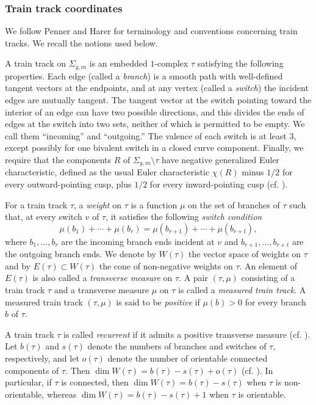 \documentclass[dvipdfmx]{amsart}
\theoremstyle{remark}
\begin{document}
\subsubsection{Train track coordinates}
We follow Penner and Harer \cite{PennerHarer1992}
for terminology and conventions concerning train tracks.
We recall the notions used below.

A train track on $\Sigma_{g,m}$ is an embedded $1$-complex $\tau$ satisfying the following properties. Each edge (called a \emph{branch}) is a smooth path with well-defined tangent vectors at the endpoints, and at any vertex (called a \emph{switch}) the incident edges are mutually tangent. The tangent vector at the switch pointing toward the interior of an edge can have two possible directions, and this divides the ends of edges at the switch into two sets, neither of which is permitted to be empty. We call them ``incoming'' and ``outgoing.'' The valence of each
switch is at least 3, except possibly for one bivalent switch in a closed
curve component. Finally, we require that the components $R$ of $\Sigma_{g,m}\setminus \tau$ have negative generalized Euler characteristic, defined as the usual Euler characteristic $\chi(R)$ minus $1/2$ for every outward-pointing cusp, plus $1/2$ for every inward-pointing cusp (cf. \cite[\S1.1]{PennerHarer1992}).

For a train track $\tau$, a \emph{weight} on $\tau$ is a function $\mu$ on the set of branches of $\tau$ such that, at every switch $v$ of $\tau$, it satisfies the following \emph{switch condition}
\[
\mu(b_1)+\cdots+\mu(b_r)=\mu(b_{r+1})+\cdots+\mu(b_{r+t}),
\]
where $b_1,\ldots,b_r$ are the incoming branch ends incident at $v$ and $b_{r+1},\ldots,b_{r+t}$ are the outgoing branch ends.
We denote by $W(\tau)$ the vector space of weights on $\tau$ and by $E(\tau)\subset W(\tau)$ the cone of non-negative weights on $\tau$.
An element of $E(\tau)$ is also called a \emph{transverse measure} on $\tau$. A pair $(\tau,\mu)$ consisting of a train track $\tau$ and a transverse measure $\mu$ on $\tau$ is called a \emph{measured train track}.
A measured train track $(\tau,\mu)$ is said to be \emph{positive} if $\mu(b)>0$ for every branch $b$ of $\tau$.

A train track $\tau$ is called \emph{recurrent} if it admits a positive transverse measure (cf. \cite[\S1.3]{PennerHarer1992}). Let $b(\tau)$ and $s(\tau)$ denote the numbers of branches and switches of $\tau$, respectively, and let $o(\tau)$ denote the number of orientable connected components of $\tau$. Then $\dim W(\tau)=b(\tau)-s(\tau)+o(\tau)$ (cf. \cite[Lemma 2.1.1]{PennerHarer1992}). In particular, if $\tau$ is connected, then $\dim W(\tau)=b(\tau)-s(\tau)$ when $\tau$ is non-orientable, whereas $\dim W(\tau)=b(\tau)-s(\tau)+1$ when $\tau$ is orientable.
\end{document}

